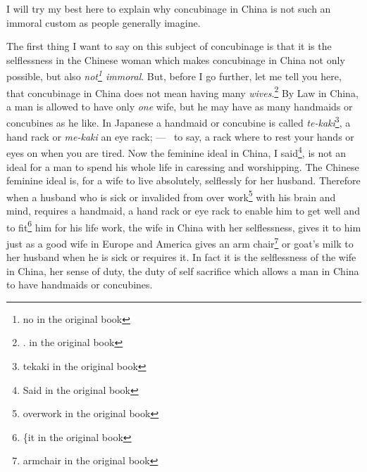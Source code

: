 I will try my best here to explain why concubinage in China is not such an immoral custom as people generally imagine.

The first thing I want to say on this subject of concubinage is that it is the selflessness in the Chinese woman which makes concubinage in China not only possible, but also \emph{not\footnote{no in the original book} immoral}.
But, before I go further, let me tell you here, that concubinage in China does not mean having many \emph{wives}.\footnote{\large{.} in the original book} 
By Law in China, a man is allowed to have only \emph{one} wife, but he may have as many handmaids or concubines as he like.
In Japanese a handmaid or concubine is called \emph{te-kaki}\footnote{tekaki in the original book}, a hand rack or \emph{me-kaki} an eye rack; --- \ie\, to say, a rack where to rest your hands or eyes on when you are tired.
Now the feminine ideal in China, I said\footnote{Said in the original book}, is not an ideal for a man to spend his whole life in caressing and worshipping.
The Chinese feminine ideal is, for a wife to live absolutely, selflessly for her husband.
Therefore when a husband who is sick or invalided from over work\footnote{overwork in the original book} with his brain and mind, requires a handmaid, a hand rack or eye rack to enable him to get well and to fit\footnote{\{it in the original book} him for his life work, the wife in China with her selflessness, gives it to him just as a good wife in Europe and America gives an arm chair\footnote{armchair in the original book} or goat's milk to her husband when he is sick or requires it.
In fact it is the selflessness of the wife in China, her sense of duty, the duty of self sacrifice which allows a man in China to have handmaids or concubines.

